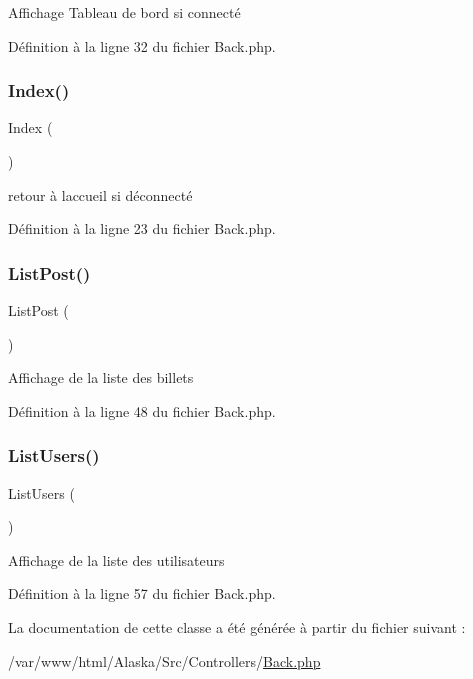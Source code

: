 Affichage Tableau de bord si connecté 

Définition à la ligne 32 du fichier Back.\+php.

\mbox{\label{class_src_1_1_controllers_1_1_back_ac36db983080e1b0934908febca5de2d9}} 
\subsubsection{\texorpdfstring{Index()}{Index()}}
{\footnotesize\ttfamily Index (\begin{DoxyParamCaption}{ }\end{DoxyParamCaption})}

retour à l\textquotesingle{}accueil si déconnecté 

Définition à la ligne 23 du fichier Back.\+php.

\mbox{\label{class_src_1_1_controllers_1_1_back_a8ce0a92892ab19020f1ebefe99d88a00}} 
\subsubsection{\texorpdfstring{List\+Post()}{ListPost()}}
{\footnotesize\ttfamily List\+Post (\begin{DoxyParamCaption}{ }\end{DoxyParamCaption})}

Affichage de la liste des billets 

Définition à la ligne 48 du fichier Back.\+php.

\mbox{\label{class_src_1_1_controllers_1_1_back_abfd4f6736a8cd4dc4fa1e012996f4a23}} 
\subsubsection{\texorpdfstring{List\+Users()}{ListUsers()}}
{\footnotesize\ttfamily List\+Users (\begin{DoxyParamCaption}{ }\end{DoxyParamCaption})}

Affichage de la liste des utilisateurs 

Définition à la ligne 57 du fichier Back.\+php.



La documentation de cette classe a été générée à partir du fichier suivant \+:\begin{DoxyCompactItemize}
\item 
/var/www/html/\+Alaska/\+Src/\+Controllers/\hyperlink{_back_8php}{Back.\+php}\end{DoxyCompactItemize}

